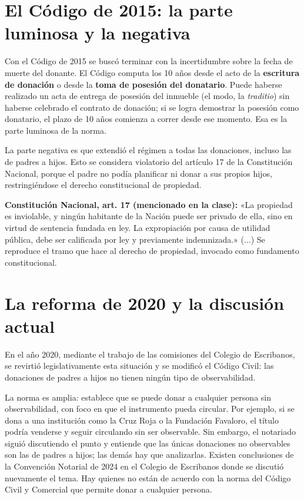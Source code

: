 \documentclass[12pt,oneside]{book}
\begin{document}
\section{El Código de 2015: la parte luminosa y la negativa}

Con el Código de 2015 se buscó terminar con la incertidumbre sobre la fecha de muerte del donante. El Código computa los 10 años desde el acto de la \textbf{escritura de donación} o desde la \textbf{toma de posesión del donatario}. Puede haberse realizado un acta de entrega de posesión del inmueble (el modo, la \textit{traditio}) sin haberse celebrado el contrato de donación; si se logra demostrar la posesión como donatario, el plazo de 10 años comienza a correr desde ese momento. Esa es la parte luminosa de la norma.

La parte negativa es que extendió el régimen a todas las donaciones, incluso las de padres a hijos. Esto se considera violatorio del artículo 17 de la Constitución Nacional, porque el padre no podía planificar ni donar a sus propios hijos, restringiéndose el derecho constitucional de propiedad.

\begin{note}
\textbf{Constitución Nacional, art. 17 (mencionado en la clase):} «La propiedad es inviolable, y ningún habitante de la Nación puede ser privado de ella, sino en virtud de sentencia fundada en ley. La expropiación por causa de utilidad pública, debe ser calificada por ley y previamente indemnizada.» (...) Se reproduce el tramo que hace al derecho de propiedad, invocado como fundamento constitucional.
\end{note}

\section{La reforma de 2020 y la discusión actual}

En el año 2020, mediante el trabajo de las comisiones del Colegio de Escribanos, se revirtió legislativamente esta situación y se modificó el Código Civil: las donaciones de padres a hijos no tienen ningún tipo de observabilidad.

La norma es amplia: establece que se puede donar a cualquier persona sin observabilidad, con foco en que el instrumento pueda circular. Por ejemplo, si se dona a una institución como la Cruz Roja o la Fundación Favaloro, el título podría venderse y seguir circulando sin ser observable. Sin embargo, el notariado siguió discutiendo el punto y entiende que las únicas donaciones no observables son las de padres a hijos; las demás hay que analizarlas. Existen conclusiones de la Convención Notarial de 2024 en el Colegio de Escribanos donde se discutió nuevamente el tema. Hay quienes no están de acuerdo con la norma del Código Civil y Comercial que permite donar a cualquier persona.
\end{document}
